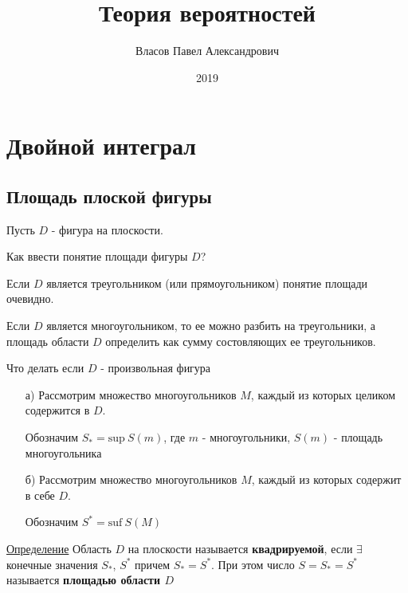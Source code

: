 \documentclass[a4paper, 14pt]{report}
\author{Власов Павел Александрович}
\title{Теория вероятностей}
\date{2019}
\begin{document}
	\maketitle
	
	\tableofcontents
	\clearpage
	
	\chapter{Двойной интеграл}
	
	\section{Площадь плоской фигуры}
	
	Пусть $D$ - фигура на плоскости.
	
	Как ввести понятие площади фигуры $D$?
	
	Если $D$ является треугольником (или прямоугольником) понятие площади очевидно.
	
	Если $D$ является многоугольником, то ее можно разбить на треугольники, а площадь области $D$ определить как сумму состовляющих ее треугольников.
	
	Что делать если $D$ - произвольная фигура
	
	\begin{enumerate}
	
		\item[а)] Рассмотрим множество многоугольников $M$, каждый из которых целиком содержится в $D$.
		
		Обозначим $S_* = \text{sup}\ S(m)$, где $m$ - многоугольники, $S(m)$ - площадь многоугольника
		
		\item[б)] Рассмотрим множество многоугольников $M$, каждый из которых содержит в себе $D$.
		
		Обозначим $S^* = \text{suf}\ S(M)$
	
	\end{enumerate}
	
	\underline{Определение} Область $D$ на плоскости называется \textbf{квадрируемой}, если $\exists$ конечные значения $S_*$, $S^*$ причем $S_* = S^*$. При этом число $S = S_* = S^*$ называется \textbf{площадью области $D$}
	
\end{document}
